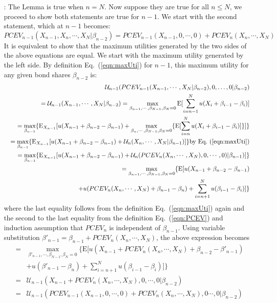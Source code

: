 \documentclass{article}[12pt letter]
\newcommand{\E}{\mathrm{E}}
\begin{document}
\proof: The Lemma is true when $n=N$. Now suppose they are true for all $n
\leq N$, we proceed to show both statements are true for $n-1$. We start with the second statement, which at $n-1$ becomes:
\[PCEV_{n-1}(X_{n-1},X_n, \cdots, X_N|\beta_{n-2}) = PCEV_{n-1}(X_{n-1},0,\cdots, 0) + PCEV_n(X_n, \cdots, X_N)\]
It is equivalent to show that the maximum utilities generated by the two sides of the above equations are equal. We start with the maximum utility generated by the left side. By definition Eq.~(\ref{eqn:maxUti}) for $n-1$, this maximum utility for any given bond shares $\beta_{n-2}$  is:
\begin{eqnarray*}
&&\mathcal{U}_{n-1}(PCEV_{n-1}(X_{n-1},\cdots,X_N|\beta_{n-2}),0,\dots,0 |\beta_{n-2})  \\&&= \mathcal{U}_{n-1}(X_{n-1},\cdots,X_N|\beta_{n-2}) = \max_{  \beta_{n-1}, \cdots, \beta_{N-1},\beta_N=0} \E[\sum_{i=n-1}^N u(X_i + \beta_{i-1}-\beta_i)] \\
&& = \max_{\beta_{n-1}} \{\E_{X_{n-1}}[ u(X_{n-1}+\beta_{n-2}-\beta_{n-1})+ \max_{\beta_{n}, \cdots,\beta_{N-1}, \beta_N=0 }\{ \E [\sum_{i=n}^N u(X_i + \beta_{i-1} - \beta_i)]\}]\} \\
&& = \max_{\beta_{n-1}} \{\E_{X_{n-1}}[ u(X_{n-1}+\beta_{n-2}-\beta_{n-1})+   \mathcal{U}_n(X_n,\cdots, X_N |\beta_{n-1}) ]\} \text{by Eq.~(\ref{eqn:maxUti})}\\
&& =\max_{\beta_{n-1}} \{\E_{X_{n-1}}[ u(X_{n-1}+\beta_{n-2}-\beta_{n-1})+ \mathcal{U}_n(PCEV_n(X_n, \cdots, X_N),0,\cdots,0)|\beta_{n-1} )]\}\\
&&= \max_{\beta_{n-1}, \cdots,\beta_{N-1}, \beta_N=0 } \{\E[u(X_{n-1}+\beta_{n-2} - \beta_{n-1}) \\&& + u(PCEV_n(X_n, \cdots, X_N) + \beta_{n-1}-\beta_n) + \sum_{i=n+1}^N u( \beta_{i-1} - \beta_i)]\}
\end{eqnarray*}
where the last equality follows from the definition Eq.~(\ref{eqn:maxUti}) again and the second to the last equality from the definition Eq.~(\ref{eqn:PCEV}) and induction assumption that $PCEV_n$ is independent of $\beta_{n-1}$. Using variable substitution $\beta'_{n-1} = \beta_{n-1} + PCEV_n(X_n, \cdots, X_N)$,  the above expression becomes
\begin{eqnarray*}
&=& \max_{ \beta'_{n-1}, \cdots, \beta_{N-1},  \beta_N=0}\{ \E[u(X_{n-1}+ PCEV_{n}(X_n,\cdots,X_N) +\beta_{n-2}- \beta'_{n-1})\\
&&+ u(\beta'_{n-1}-\beta_n) + \sum_{i=n+1}^N u(\beta_{i-1}-\beta_i)] \} \\
&=& \mathcal{U}_{n-1}(X_{n-1}+PCEV_n(X_n,\cdots,X_N), 0, \cdots,0|\beta_{n-2}) \\
&=& \mathcal{U}_{n-1}(PCEV_{n-1}(X_{n-1},0,\cdots,0) + PCEV_n(X_n,\cdots,X_N) ,0\cdots,0|\beta_{n-2})
\end{eqnarray*}
\end{document}
